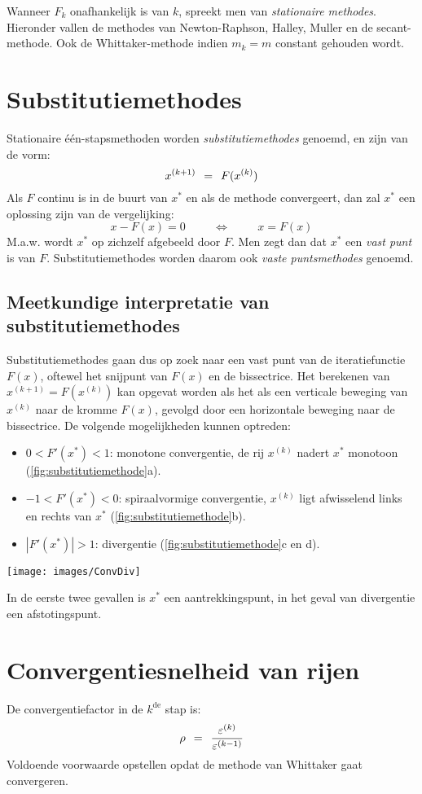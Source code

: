 \documentclass[11pt]{report}
\def \eq {\hspace{1.5mm}=\hspace{1.5mm}}
\def \H {\hspace{1cm}}
\begin{document}
	Wanneer $F_k$ onafhankelijk is van $k$, spreekt men van \textit{stationaire methodes}. Hieronder vallen de methodes van Newton-Raphson, Halley, Muller en de secant-methode. Ook de Whittaker-methode indien $m_k = m$ constant gehouden wordt. 
	
\section{Substitutiemethodes}
	Stationaire \'{e}\'{e}n-stapsmethoden worden \textit{substitutiemethodes} genoemd, en zijn van de vorm:
	$$x^{(k+1)} \eq F(x^{(k)})$$
	Als $F$ continu is in de buurt van $x^*$ en als de methode convergeert, dan zal $x^*$ een oplossing zijn van de vergelijking:
	$$x - F(x) = 0 \H\Leftrightarrow\H x = F(x)$$
	M.a.w. wordt $x^*$ op zichzelf afgebeeld door $F$. Men zegt dan dat $x^*$ een \textit{vast punt} is van $F$. Substitutiemethodes worden daarom ook \textit{vaste puntsmethodes} genoemd.
\subsection{Meetkundige interpretatie van substitutiemethodes}
	Substitutiemethodes gaan dus op zoek naar een vast punt van de iteratiefunctie $F(x)$, oftewel het snijpunt van $F(x)$ en de bissectrice. Het berekenen van $x^{(k+1)} = F(x^{(k)})$ kan opgevat worden als het als een verticale beweging van $x^{(k)}$ naar de kromme $F(x)$, gevolgd door een horizontale beweging naar de bissectrice. De volgende mogelijkheden kunnen optreden:
	\begin{itemize}
		\item $0 < F'(x^*) < 1$: monotone convergentie, de rij $x^{(k)}$ nadert $x^*$ monotoon (\ref{fig:substitutiemethode}a).
		\item $-1 < F'(x^*) < 0$: spiraalvormige convergentie, $x^{(k)}$ ligt afwisselend links en rechts van $x^*$ (\ref{fig:substitutiemethode}b).
		\item $|F'(x^*)| > 1$: divergentie (\ref{fig:substitutiemethode}c en d).
	\end{itemize}
	
	\begin{figure*}[h]
		\texttt{[image: images/ConvDiv]}
		\caption{Substitutiemethode}
		\label{fig:substitutiemethode}
	\end{figure*}
	In de eerste twee gevallen is $x^*$ een aantrekkingspunt, in het geval van divergentie een afstotingspunt.
	
\section{Convergentiesnelheid van rijen}
	De convergentiefactor in de $k^{\text{de}}$ stap is:
	\begin{equation}
		\rho \eq \frac{\varepsilon^{(k)}}{\varepsilon^{(k-1)}}
	\end{equation}
	Voldoende voorwaarde opstellen opdat de methode van Whittaker gaat convergeren. 
	
	
	 	 
	 
\end{document}
